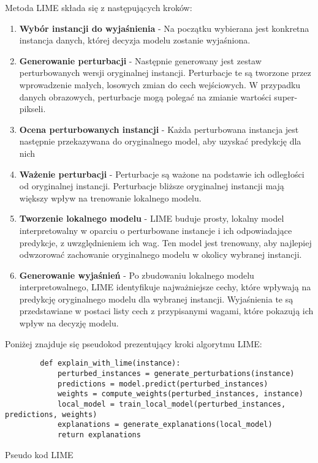Metoda LIME składa się z następujących kroków:
\begin{enumerate}
	\item \textbf{Wybór instancji do wyjaśnienia} - Na początku wybierana jest konkretna instancja danych, której decyzja modelu zostanie  wyjaśniona.
	\item \textbf{Generowanie perturbacji} - Następnie generowany jest zestaw perturbowanych wersji oryginalnej instancji.
	      Perturbacje te są tworzone przez wprowadzenie małych, losowych zmian do cech wejściowych.
	      W przypadku danych obrazowych, perturbacje mogą polegać na zmianie wartości super-pikseli.
	\item \textbf{Ocena perturbowanych instancji} - Każda perturbowana instancja jest następnie przekazywana do oryginalnego model, aby uzyskać predykcję dla nich
	\item \textbf{Ważenie perturbacji} - Perturbacje są ważone na podstawie ich odległości od oryginalnej instancji.
	      Perturbacje bliższe oryginalnej instancji mają większy wpływ na trenowanie lokalnego modelu.
	\item \textbf{Tworzenie lokalnego modelu} - LIME buduje prosty, lokalny model interpretowalny w oparciu o perturbowane instancje i ich odpowiadające predykcje, z uwzględnieniem ich wag.
	      Ten model jest trenowany, aby najlepiej odwzorować zachowanie oryginalnego modelu w okolicy wybranej instancji.
	\item \textbf{Generowanie wyjaśnień} - Po zbudowaniu lokalnego modelu interpretowalnego, LIME identyfikuje najważniejsze cechy, które wpływają na predykcję oryginalnego modelu dla wybranej instancji.
	      Wyjaśnienia te są przedstawiane w postaci listy cech z przypisanymi wagami, które pokazują ich wpływ na decyzję modelu.
\end{enumerate}

Poniżej znajduje się pseudokod prezentujący kroki algorytmu LIME:
\begin{listing}
	\begin{verbatim}
        def explain_with_lime(instance):
            perturbed_instances = generate_perturbations(instance)
            predictions = model.predict(perturbed_instances)
            weights = compute_weights(perturbed_instances, instance)
            local_model = train_local_model(perturbed_instances, predictions, weights)
            explanations = generate_explanations(local_model)
            return explanations
  \end{verbatim}
	\caption{Pseudo kod LIME} \label{listing:lime}
\end{listing}

